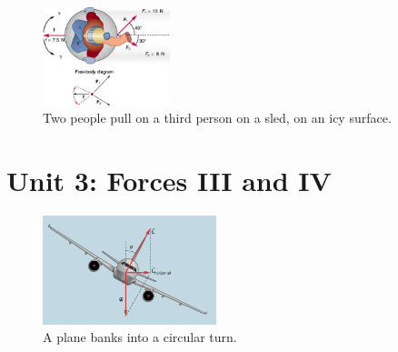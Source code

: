 \documentclass[10pt]{article}
\begin{document}
\begin{figure}
\centering
\includegraphics[width=0.33\textwidth]{sled.jpeg}
\caption{\label{fig:3} Two people pull on a third person on a sled, on an icy surface.}
\end{figure}

\section{Unit 3: Forces III and IV}

\begin{figure}
\centering
\includegraphics[width=0.45\textwidth]{plane.jpeg}
\caption{\label{fig:4} A plane banks into a circular turn.}
\end{figure}
\end{document}
